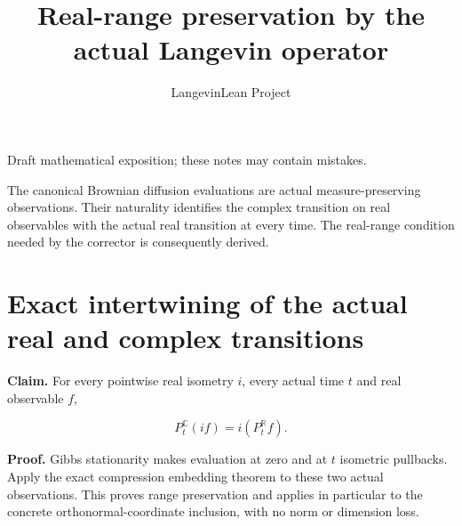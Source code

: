 \documentclass[11pt,a4paper]{article}
\title{\texorpdfstring{Real-range preservation by the actual Langevin operator}{Real-range preservation by the actual Langevin operator}}
\author{LangevinLean Project}
\date{}
\begin{document}
\maketitle
Draft mathematical exposition; these notes may contain mistakes.


The canonical Brownian diffusion evaluations are actual measure-preserving observations. Their naturality identifies the complex transition on real observables with the actual real transition at every time. The real-range condition needed by the corrector is consequently derived.


\section{\texorpdfstring{Exact intertwining of the actual real and complex transitions}{Exact intertwining of the actual real and complex transitions}}


\textbf{Claim.} For every pointwise real isometry \(i\), every actual time \(t\) and real observable \(f\),

\[P_t^{\mathbb C}(if)=i(P_t^{\mathbb R}f).\]

\textbf{Proof.} Gibbs stationarity makes evaluation at zero and at \(t\) isometric pullbacks. Apply the exact compression embedding theorem to these two actual observations. This proves range preservation and applies in particular to the concrete orthonormal-coordinate inclusion, with no norm or dimension loss.
\end{document}

